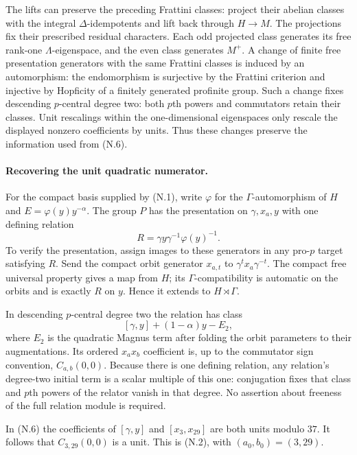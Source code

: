 \documentclass[11pt,a4paper]{article}
\theoremstyle{definition}
\begin{document}
The lifts can preserve the preceding Frattini classes: project their abelian classes with the integral $\Delta$-idempotents and lift back through $H\to M$. The projections fix their prescribed residual characters. Each odd projected class generates its free rank-one $\Lambda$-eigenspace, and the even class generates $M^+$. A change of finite free presentation generators with the same Frattini classes is induced by an automorphism: the endomorphism is surjective by the Frattini criterion and injective by Hopficity of a finitely generated profinite group. Such a change fixes descending $p$-central degree two: both $p$th powers and commutators retain their classes. Unit rescalings within the one-dimensional eigenspaces only rescale the displayed nonzero coefficients by units. Thus these changes preserve the information used from (N.6).

\paragraph{Recovering the unit quadratic numerator.}
For the compact basis supplied by (N.1), write $\varphi$ for the $\Gamma$-automorphism of $H$ and $E=\varphi(y)y^{-\alpha}$. The group $P$ has the presentation on $\gamma,x_a,y$ with one defining relation
\[
 R=\gamma y\gamma^{-1}\varphi(y)^{-1}.
\]
To verify the presentation, assign images to these generators in any pro-$p$ target satisfying $R$. Send the compact orbit generator $x_{a,t}$ to $\gamma^t x_a\gamma^{-t}$. The compact free universal property gives a map from $H$; its $\Gamma$-compatibility is automatic on the orbits and is exactly $R$ on $y$. Hence it extends to $H\rtimes\Gamma$.

In descending $p$-central degree two the relation has class
\[
 [\gamma,y]+(1-\alpha)y-E_2,
\]
where $E_2$ is the quadratic Magnus term after folding the orbit parameters to their augmentations. Its ordered $x_a x_b$ coefficient is, up to the commutator sign convention, $C_{a,b}(0,0)$. Because there is one defining relation, any relation's degree-two initial term is a scalar multiple of this one: conjugation fixes that class and $p$th powers of the relator vanish in that degree. No assertion about freeness of the full relation module is required.

In (N.6) the coefficients of $[\gamma,y]$ and $[x_3,x_{29}]$ are both units modulo $37$. It follows that $C_{3,29}(0,0)$ is a unit. This is (N.2), with $(a_0,b_0)=(3,29)$.
\end{document}
